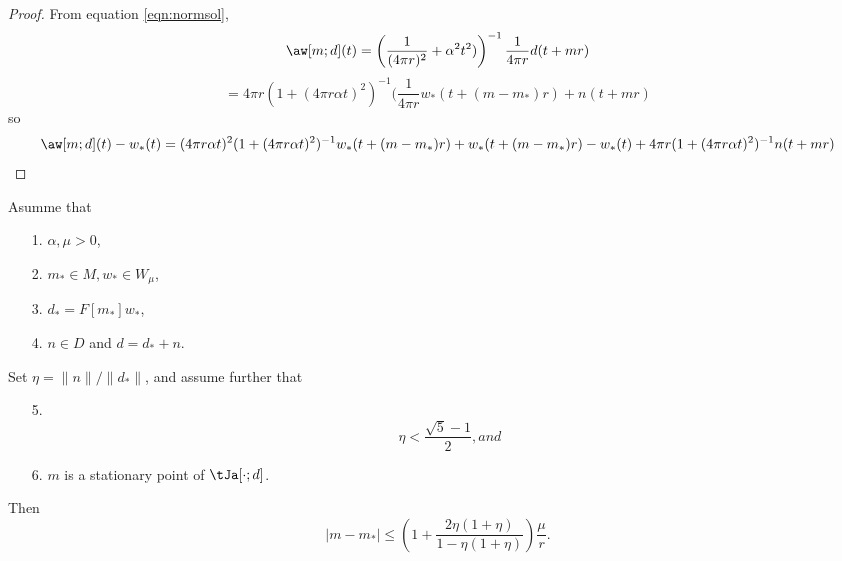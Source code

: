\begin{proof}
  From equation \ref{eqn:normsol},
  \[
    \aw[m;d](t) = 
    \left(\frac{1}{(4\pi r)^2} + \alpha^2 t^2)\right)^{-1}\frac{1}{4 \pi r}d(t+mr)
  \]
  \[
    =4\pi r(1 + (4\pi r \alpha t)^2)^{-1} (\frac{1}{4\pi r}
    w_*(t+(m-m_*)r) + n(t+mr) 
  \]
  so
  \begin{equation}
    \label{eqn:wres}
    \aw[m;d](t) - w_*(t) = (4\pi r \alpha t)^2 (1+ (4\pi r \alpha t)^2)^{-1}w_*(t+(m-m_*)r)
    +w_*(t+(m-m_*)r)-w_*(t) + 4 \pi r (1 + (4\pi r \alpha t)^2)^{-1}n(t+mr)
  \end{equation}
\end{proof}

\begin{theorem}
  \label{thm:mnoiseres}
  Asumme that
  \begin{itemize}
  \item[1. ] $\alpha, \mu> 0$,
  \item[2. ] $m_* \in M, w_* \in W_{\mu}$,
  \item[3. ] $d_* = F[m_*]w_*$,
  \item[4. ] $n \in D$ and $d = d_* + n$.
  \end{itemize}
  Set $\eta = \|n\|/\|d_*\|$, and assume further that
  \begin{itemize}
  \item[5. ]
    \begin{equation}
      \label{eqn:mnoisecond}
      \eta < \frac{\sqrt{5}-1}{2}, and
    \end{equation}
  \item[6. ] $m$ is a stationary point of $\tJa[\cdot;d]$.
  \end{itemize}
  Then
  \begin{equation}
    \label{eqn:mnoisesuff}
    |m-m_*| \le \left(1+\frac{2\eta(1+\eta)}{1-\eta(1+\eta)}\right)\frac{\mu}{r}.
  \end{equation}
\end{theorem}

